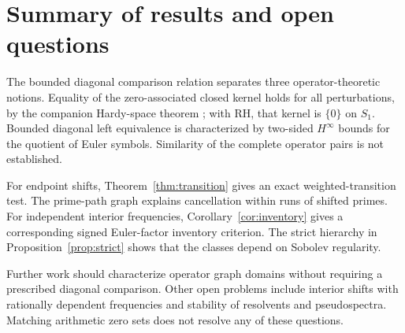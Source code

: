 \documentclass[12pt,letterpaper]{article}
\numberwithin{equation}{section}
\theoremstyle{remark}
\begin{document}
\section{Summary of results and open questions}\label{sec:summary}
The bounded diagonal comparison relation separates three
operator-theoretic notions. Equality of the zero-associated
closed kernel holds for all perturbations, by the companion
Hardy-space theorem \cite{GS26}; with RH, that kernel is $\{0\}$ on $S_1$. Bounded diagonal
left equivalence is characterized by two-sided \(H^\infty\)
bounds for the quotient of Euler symbols.
Similarity of the complete operator pairs is not established.

For endpoint shifts, Theorem~\ref{thm:transition} gives an
exact weighted-transition test. The prime-path graph
explains cancellation within runs of shifted primes.
For independent interior frequencies,
Corollary~\ref{cor:inventory} gives a corresponding signed
Euler-factor inventory criterion. The strict hierarchy
in Proposition~\ref{prop:strict} shows that the classes
depend on Sobolev regularity.

Further work should characterize operator graph domains
without requiring a prescribed diagonal comparison.
Other open problems include interior shifts with rationally
dependent frequencies and stability of resolvents and
pseudospectra. Matching arithmetic zero sets does not
resolve any of these questions.
\end{document}
